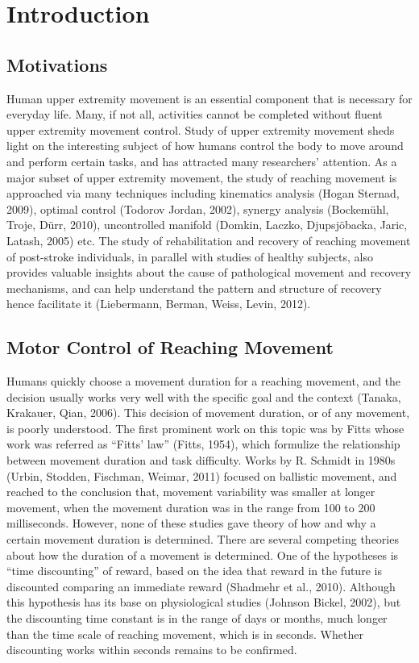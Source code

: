 \chapter{Introduction}
\label{cha:introduction}


\section{Motivations}
\label{sec:motivations}
Human upper extremity movement is an essential component that is necessary for everyday life.
Many, if not all, activities cannot be completed without fluent upper extremity movement control.
Study of upper extremity movement sheds light on the interesting subject of how humans control the body to move around and perform certain tasks, and has attracted many researchers’ attention. 
As a major subset of upper extremity movement, the study of reaching movement is approached via many techniques including kinematics analysis (Hogan  Sternad, 2009), optimal control (Todorov  Jordan, 2002), synergy analysis (Bockemühl, Troje,  Dürr, 2010), uncontrolled manifold (Domkin, Laczko, Djupsjöbacka, Jaric, Latash, 2005) etc. 
The study of rehabilitation and recovery of reaching movement of post-stroke individuals, in parallel with studies of healthy subjects, also provides valuable insights about the cause of pathological movement and recovery mechanisms, and can help understand the pattern and structure of recovery hence facilitate it (Liebermann, Berman, Weiss, Levin, 2012). 


\section{Motor Control of Reaching Movement}
Humans quickly choose a movement duration for a reaching movement, and the decision usually works very well with the specific goal and the context (Tanaka, Krakauer,  Qian, 2006). 
This decision of movement duration, or of any movement, is poorly understood. 
The first prominent work on this topic was by Fitts whose work was referred as “Fitts’ law” (Fitts, 1954), which formulize the relationship between movement duration and task difficulty. 
Works by R. Schmidt in 1980s (Urbin, Stodden, Fischman,  Weimar, 2011) focused on ballistic movement, and reached to the conclusion that, movement variability was smaller at longer movement, when the movement duration was in the range from 100 to 200 milliseconds. 
However, none of these studies gave theory of how and why a certain movement duration is determined. 
There are several competing theories about how the duration of a movement is determined. 
One of the hypotheses is “time discounting” of reward, based on the idea that reward in the future is discounted comparing an immediate reward (Shadmehr et al., 2010).
Although this hypothesis has its base on physiological studies (Johnson  Bickel, 2002), but the discounting time constant is in the range of days or months, much longer than the time scale of reaching movement, which is in seconds. 
Whether discounting works within seconds remains to be confirmed. 

